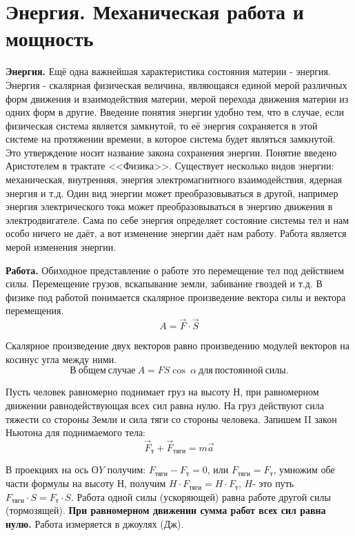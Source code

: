 \documentclass[a6paper, 11pt]{diss_4}
\renewcommand{\'}{\,'}
\begin{document}
\section{Энергия. Механическая работа и мощность}

\textbf{Энергия.}
  Ещё одна важнейшая характеристика состояния материи - энергия. Энергия
- скалярная физическая величина, являющаяся единой мерой различных форм
движения и взаимодействия материи, мерой перехода движения материи из одних
форм в другие. Введение понятия энергии удобно тем, что в случае, если
физическая система является замкнутой, то её энергия сохраняется в этой системе
на протяжении времени, в которое система будет являться замкнутой. Это
утверждение носит название закона сохранения энергии. Понятие введено
Аристотелем в трактате <<Физика>>. Существует несколько видов энергии:
механическая, внутренняя, энергия электромагнитного взаимодействия, ядерная
энергия и т.д. Один вид энергии может преобразовываться в другой, например
энергия электрического тока может преобразовываться в энергию движения в
электродвигателе. Сама по себе энергия определяет состояние системы тел и нам
особо ничего не даёт, а вот изменение энергии даёт нам работу. Работа является
мерой изменения энергии.

\textbf{Работа.}
  Обиходное представление о работе это перемещение тел под действием силы.
Перемещение грузов, вскапывание земли, забивание гвоздей и т.д. В физике под
работой понимается скалярное произведение вектора силы и вектора перемещения.
\[
A=\vec{F}\cdot\vec{S}
\]

  Скалярное произведение двух векторов равно произведению модулей векторов
на косинус угла между ними.
\[
     В\ общем\ случае\ A=FS\cos\ \alpha\ для\ постоянной\ силы.
\]

  Пусть человек равномерно поднимает груз на высоту $Н$, при равномерном
движении равнодействующая всех сил равна нулю. На груз действуют сила тяжести
со стороны Земли и сила тяги со стороны человека. Запишем II закон Ньютона для
поднимаемого тела:
        \[
        \vec{F}_{т}+\vec{F}_{тяги}=m\vec{a}
        \]

  В проекциях на ось $ОY$ получим: $F_{тяги}-F_{т}=0$, или $F_{тяги}=F_{т}$,
умножим обе части формулы на высоту $Н$, получим $H\cdot F_{тяги}=H\cdot F_{т}$,
 $H$- это путь $F_{тяги}\cdot S=F_{т}\cdot S$. Работа одной силы (ускоряющей)
 равна работе другой силы (тормозящей). \textbf{При равномерном движении сумма
работ всех сил равна нулю.} Работа измеряется в джоулях (Дж).
\end{document}
